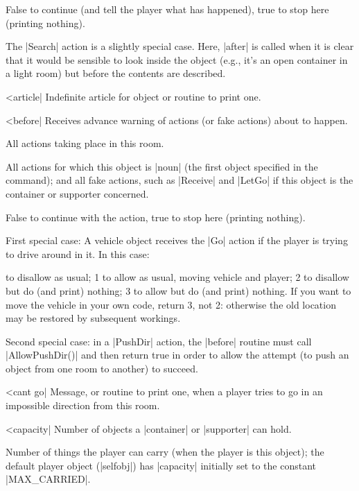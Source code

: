 {{{\rr False to continue (and tell the player what has happened), true to
stop here (printing nothing).

\noindent The |Search| action is a slightly special case.  Here, |after| is
called when it is clear that it would be sensible to look inside the object
(e.g., it's an open container in a light room) but before the contents
are described.

^^|article|
\fo Indefinite article for object or routine to print one.

\nrr

^^|before|
Receives advance warning of actions (or fake actions) about to happen.

\fr All actions taking place in this room.

\fo All actions for which this object is |noun| (the first object
specified in the command); and all fake actions, such as |Receive|
and |LetGo| if this object is the container or supporter concerned.

\rr False to continue with the action, true to stop here (printing
nothing).

\noindent First special case: A vehicle object receives the |Go|
action if the player is trying to drive around in it.  In this case:

 to disallow as usual; 1 to allow as usual, moving vehicle and
player; 2 to disallow but do (and print) nothing; 3 to allow but do
(and print) nothing.  If you want to move the vehicle in your own code,
return 3, not 2: otherwise the old location may be restored by subsequent
workings.

\noindent Second special case: in a |PushDir| action, the |before|
routine must call |AllowPushDir()| and then return true in order to
allow the attempt (to push an object from one room to another) to
succeed.

^^|cant go|
\fr Message, or routine to print one, when a player tries to go in an
impossible direction from this room.

\nrr

^^|capacity|
\fo Number of objects a |container| or |supporter|
can hold.

\fpo Number of things the player can carry (when the player is this
object); the default player object (|selfobj|) has |capacity| initially
set to the constant |MAX_CARRIED|.

}}}
